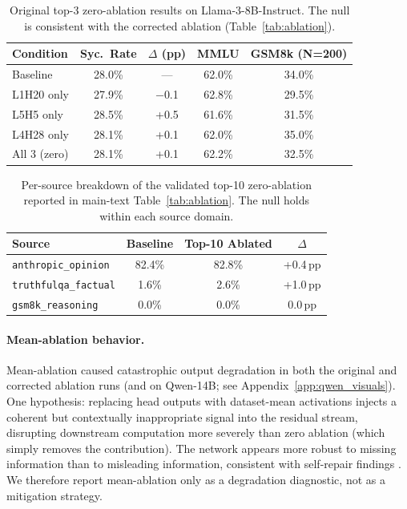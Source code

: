 \documentclass{article}
\begin{document}
\begin{table}[!ht]
\centering
\small
\caption{Original top-3 zero-ablation results on Llama-3-8B-Instruct. The null is consistent with the corrected ablation (Table~\ref{tab:ablation}).}
\label{tab:original_ablation}
\begin{tabular}{@{}lcccc@{}}
\toprule
\textbf{Condition} & \textbf{Syc.\ Rate} & \textbf{$\Delta$ (pp)} & \textbf{MMLU} & \textbf{GSM8k (N=200)} \\
\midrule
Baseline & 28.0\% & --- & 62.0\% & 34.0\% \\
L1H20 only & 27.9\% & $-$0.1 & 62.8\% & 29.5\% \\
L5H5 only & 28.5\% & +0.5 & 61.6\% & 31.5\% \\
L4H28 only & 28.1\% & +0.1 & 62.0\% & 35.0\% \\
All 3 (zero) & 28.1\% & +0.1 & 62.2\% & 32.5\% \\
\bottomrule
\end{tabular}
\end{table}

\begin{table}[!ht]
\centering
\small
\caption{Per-source breakdown of the validated top-10 zero-ablation reported in main-text Table~\ref{tab:ablation}. The null holds within each source domain.}
\label{tab:top10_per_source}
\begin{tabular}{@{}lccc@{}}
\toprule
\textbf{Source} & \textbf{Baseline} & \textbf{Top-10 Ablated} & \textbf{$\Delta$} \\
\midrule
\texttt{anthropic\_opinion} & 82.4\% & 82.8\% & +0.4\,pp \\
\texttt{truthfulqa\_factual} & 1.6\% & 2.6\% & +1.0\,pp \\
\texttt{gsm8k\_reasoning} & 0.0\% & 0.0\% & 0.0\,pp \\
\bottomrule
\end{tabular}
\end{table}

\paragraph{Mean-ablation behavior.} Mean-ablation caused catastrophic output degradation in both the original and corrected ablation runs (and on Qwen-14B; see Appendix~\ref{app:qwen_visuals}). One hypothesis: replacing head outputs with dataset-mean activations injects a coherent but contextually inappropriate signal into the residual stream, disrupting downstream computation more severely than zero ablation (which simply removes the contribution). The network appears more robust to missing information than to misleading information, consistent with self-repair findings \citep{mcgrath2023hydra}. We therefore report mean-ablation only as a degradation diagnostic, not as a mitigation strategy.
\end{document}
